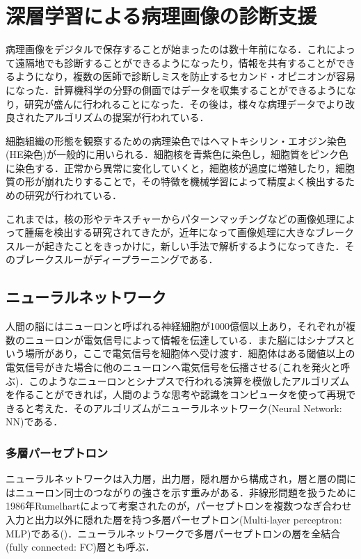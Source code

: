 \chapter{深層学習による病理画像の診断支援}
\label{chap_review}

病理画像をデジタルで保存することが始まったのは数十年前になる．これによって遠隔地でも診断することができるようになったり，情報を共有することができるようになり，複数の医師で診断しミスを防止するセカンド・オピニオンが容易になった．計算機科学の分野の側面ではデータを収集することができるようになり，研究が盛んに行われることになった．その後は，様々な病理データでより改良されたアルゴリズムの提案が行われている．\cite{litjens2017survey}

細胞組織の形態を観察するための病理染色ではヘマトキシリン・エオジン染色(HE染色)が一般的に用いられる．細胞核を青紫色に染色し，細胞質をピンク色に染色する．正常から異常に変化していくと，細胞核が過度に増殖したり，細胞質の形が崩れたりすることで，その特徴を機械学習によって精度よく検出するための研究が行われている．\cite{wang2016deep}

これまでは，核の形やテキスチャーからパターンマッチングなどの画像処理によって腫瘍を検出する研究されてきたが，近年になって画像処理に大きなブレークスルーが起きたことをきっかけに，新しい手法で解析するようになってきた．そのブレークスルーがディープラーニングである．

\section{ニューラルネットワーク}\label{sec:NeuralNetwork}
人間の脳にはニューロンと呼ばれる神経細胞が1000億個以上あり，それぞれが複数のニューロンが電気信号によって情報を伝達している．また脳にはシナプスという場所があり，ここで電気信号を細胞体へ受け渡す．細胞体はある閾値以上の電気信号がきた場合に他のニューロンへ電気信号を伝播させる(これを発火と呼ぶ)．このようなニューロンとシナプスで行われる演算を模倣したアルゴリズムを作ることができれば，人間のような思考や認識をコンピュータを使って再現できると考えた．そのアルゴリズムがニューラルネットワーク(Neural Network: NN)である．

\subsection{多層パーセプトロン}
ニューラルネットワークは入力層，出力層，隠れ層から構成され，層と層の間にはニューロン同士のつながりの強さを示す重みがある．非線形問題を扱うために1986年Rumelhartによって考案されたのが，パーセプトロンを複数つなぎ合わせ入力と出力以外に隠れた層を持つ多層パーセプトロン(Multi-layer perceptron: MLP)である()．ニューラルネットワークで多層パーセプトロンの層を全結合(fully connected: FC)層とも呼ぶ．

